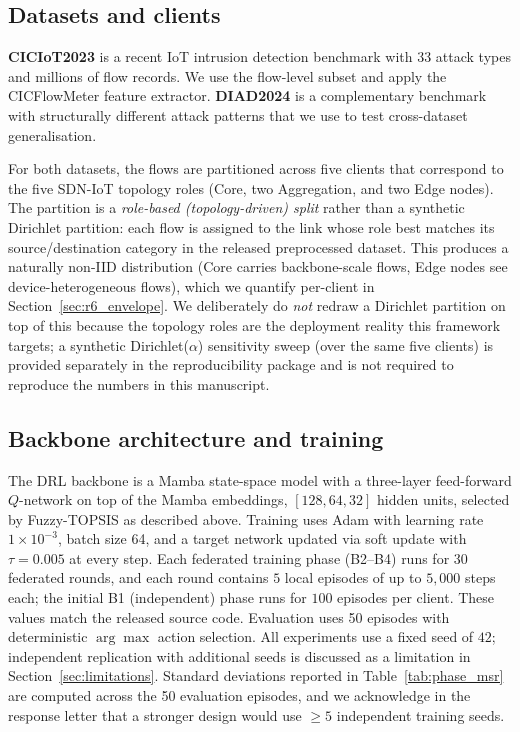 \documentclass[ai,article,submit,moreauthors,pdftex]{Definitions/mdpi}
\newcommand{\rev}[1]{#1}
\begin{document}
\subsection{Datasets and clients}\label{sec:methods_data}

\textbf{CICIoT2023}\cite{ciciot2023} is a recent IoT intrusion detection
benchmark with 33 attack types and millions of flow records. We use the
flow-level subset and apply the CICFlowMeter feature
extractor\cite{sharafaldin2019cicflowmeter}. \textbf{DIAD2024}
\cite{diad2024} is a complementary benchmark with structurally different
attack patterns that we use to test cross-dataset generalisation.

\rev{For both datasets, the flows are partitioned across five clients that correspond to the five SDN-IoT topology roles (Core, two Aggregation, and two Edge nodes). The partition is a \emph{role-based (topology-driven) split} rather than a synthetic Dirichlet partition: each flow is assigned to the link whose role best matches its source/destination category in the released preprocessed dataset. This produces a naturally non-IID distribution (Core carries backbone-scale flows, Edge nodes see device-heterogeneous flows), which we quantify per-client in Section~\ref{sec:r6_envelope}. We deliberately do \emph{not} redraw a Dirichlet partition on top of this because the topology roles are the deployment reality this framework targets; a synthetic Dirichlet($\alpha$) sensitivity sweep (over the same five clients) is provided separately in the reproducibility package and is not required to reproduce the numbers in this manuscript.}

\subsection{Backbone architecture and training}\label{sec:methods_arch}

The DRL backbone is a Mamba state-space model\cite{gu2023mamba,
gu2022efficiently,dao2024mamba2} with \rev{a three-layer feed-forward $Q$-network on top of the Mamba embeddings, $[128, 64, 32]$ hidden units}, selected by Fuzzy-TOPSIS as described above. Training
uses Adam\cite{kingma2015adam} with learning rate \rev{$1\times 10^{-3}$},
batch size 64, and a target network updated \rev{via soft update with $\tau = 0.005$ at every step}. \rev{Each federated training phase (B2--B4) runs for $30$ federated rounds, and each round contains $5$ local episodes of up to $5{,}000$ steps each; the initial B1 (independent) phase runs for $100$ episodes per client. These values match the released source code.} Evaluation uses 50 episodes with deterministic
$\arg\max$ action selection. \rev{All experiments use a fixed seed of $42$; independent replication with additional seeds is discussed as a limitation in Section~\ref{sec:limitations}.} Standard deviations reported in
Table~\ref{tab:phase_msr} \rev{are computed across the 50 evaluation episodes, and we acknowledge in the response letter that a stronger design would use $\geq 5$ independent training seeds.}
\end{document}

